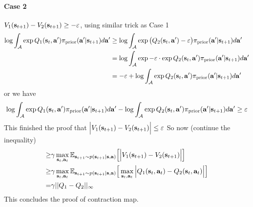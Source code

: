 \paragraph{Case 2} $V_1(\bold{s}_{t+1}) - V_2(\bold{s}_{t+1}) \ge -\varepsilon$, using similar trick as Case 1
\begin{equation}
    \begin{aligned}
        \log \int_{\mathcal{A}} \exp Q_1(\bold{s}_t, \bold{a}') \pi_{\text{prior}} (\bold{a}' | \bold{s}_{t+1}) d\bold{a}' &\ge \log \int_{\mathcal{A}} \exp \big(Q_2(\bold{s}_t, \bold{a}') - \varepsilon \big) \pi_{\text{prior}} (\bold{a}' | \bold{s}_{t+1}) d\bold{a}' \\ 
        &= \log \int_{\mathcal{A}} \exp -\varepsilon \cdot \exp Q_2(\bold{s}_t, \bold{a}') \pi_{\text{prior}} (\bold{a}' | \bold{s}_{t+1}) d\bold{a}' \\ 
        &= -\varepsilon + \log \int_{\mathcal{A}} \exp Q_2(\bold{s}_t, \bold{a}') \pi_{\text{prior}} (\bold{a}' | \bold{s}_{t+1}) d\bold{a}'
    \end{aligned}
\end{equation}
or we have 
\begin{equation}
    \log \int_{\mathcal{A}} \exp Q_1(\bold{s}_t, \bold{a}') \pi_{\text{prior}} (\bold{a}' | \bold{s}_{t+1}) d\bold{a}' - \log \int_{\mathcal{A}} \exp Q_2(\bold{s}_t, \bold{a}') \pi_{\text{prior}} (\bold{a}' | \bold{s}_{t+1}) d\bold{a}' \ge \varepsilon
\end{equation}
This finished the proof that $
\Big| V_1(\bold{s}_{t+1}) - V_2(\bold{s}_{t+1})  \Big| \le \varepsilon$
So now (continue the inequality)
\begin{equation}
    \begin{aligned}
        \ge & \gamma\max_{\bold{s}_t, \bold{a}_t}  \mathbb{E}_{\bold{s}_{t+1} \sim p(\bold{s}_{t+1} | \bold{s}, \bold{a})} \Big[\Big| V_1(\bold{s}_{t+1}) - V_2(\bold{s}_{t+1})  \Big|\Big]  \\
        \ge & \gamma\max_{\bold{s}_t, \bold{a}_t}  \mathbb{E}_{\bold{s}_{t+1} \sim p(\bold{s}_{t+1} | \bold{s}, \bold{a})} \Big[\max_{\bold{s}_t, \bold{a}_t}\Big| Q_1(\bold{s}_t, \bold{a}_t) - Q_2(\bold{s}_t, \bold{a}_t) \Big|\Big] \\
        = & \gamma  || Q_1 - Q_2 ||_{\infty}
    \end{aligned}
\end{equation}
This concludes the proof of contraction map.


